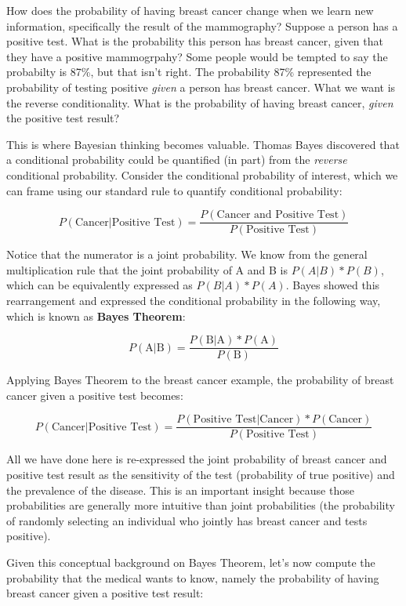 \documentclass[
]{book}
\begin{document}
How does the probability of having breast cancer change when we learn
new information, specifically the result of the mammography? Suppose a
person has a positive test. What is the probability this person has
breast cancer, given that they have a positive mammogrpahy? Some people
would be tempted to say the probabilty is 87\%, but that isn't right. The
probability 87\% represented the probability of testing positive \emph{given}
a person has breast cancer. What we want is the reverse conditionality.
What is the probability of having breast cancer, \emph{given} the positive
test result?

This is where Bayesian thinking becomes valuable. Thomas Bayes
discovered that a conditional probability could be quantified (in part)
from the \emph{reverse} conditional probability. Consider the conditional
probability of interest, which we can frame using our standard rule to
quantify conditional probability:

\[
P(\text{Cancer}|\text{Positive Test}) = \frac{P(\text{Cancer and Positive Test})}{P(\text{Positive Test})}
\]

Notice that the numerator is a joint probability. We know from the
general multiplication rule that the joint probability of A and B is
\(P(A|B)*P(B)\), which can be equivalently expressed as \(P(B|A)*P(A)\).
Bayes showed this rearrangement and expressed the conditional
probability in the following way, which is known as \textbf{Bayes Theorem}:

\[
P(\text{A}|\text{B}) = \frac{P(\text{B|A})*P(\text{A})}{P(\text{B})}
\]

Applying Bayes Theorem to the breast cancer example, the probability of
breast cancer given a positive test becomes:

\[
P(\text{Cancer}|\text{Positive Test}) = \frac{P(\text{Positive Test|Cancer})*P(\text{Cancer})}{P(\text{Positive Test})}
\]

All we have done here is re-expressed the joint probability of breast
cancer and positive test result as the sensitivity of the test
(probability of true positive) and the prevalence of the disease. This
is an important insight because those probabilities are generally more
intuitive than joint probabilities (the probability of randomly
selecting an individual who jointly has breast cancer and tests
positive).

Given this conceptual background on Bayes Theorem, let's now compute the
probability that the medical wants to know, namely the probability of
having breast cancer given a positive test result:
\end{document}
